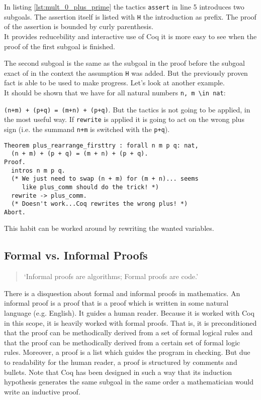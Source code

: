 In listing \ref{lst:mult_0_plus_prime} the tactics \lstinline!assert! in line 5 introduces two subgoals. 
The assertion itself is listed with \lstinline!H! the introduction as prefix.
The proof of the assertion is bounded by curly parenthesis.\\
It provides reducebility and interactive use of Coq it is more easy to see when the proof of the first subgoal is finished.

The second subgoal is the same as the subgoal in the proof before the subgoal exact of in the context the assumption \lstinline!H! was added.
But the previously proven fact is able to be used to make progress.
Let's look at another example.\\
 
It should be shown that we have for all natural numbers \lstinline!n, m \in nat!:
 
\lstinline!(n+m) + (p+q) = (m+n) + (p+q)!.
But the tactics is not going to be applied, in the most useful way. 
If \lstinline!rewrite! is applied it is going to act on the wrong plus sign (i.e. the summand \lstinline!n+m! is switched with the \lstinline!p+q!).
\begin{lstlisting}[caption = \lstinline!plus_rearrange_firstttry!, label=lst:plus_rearrange_firsttry]
Theorem plus_rearrange_firsttry : forall n m p q: nat,
  (n + m) + (p + q) = (m + n) + (p + q).
Proof.
  intros n m p q.
  (* We just need to swap (n + m) for (m + n)... seems
     like plus_comm should do the trick! *)
  rewrite -> plus_comm.
  (* Doesn't work...Coq rewrites the wrong plus! *)
Abort.
\end{lstlisting}

This habit can be worked around by rewriting the wanted variables. 

\subsection{Formal vs. Informal Proofs}

\begin{quote}
`Informal proofs are algorithms; Formal proofs are code.'
\end{quote}

There is a disquestion about formal and informal proofs in mathematics. 
An informal proof is a proof that is a proof which is written in some natural language (e.g. English).
It guides a human reader.   
Because it is worked with Coq in this scope, it is heavily worked with formal proofs.
That is, it is preconditioned that the proof can be methodically derived from a set of formal logical rules and that the proof can be methodically derived from a certain set of formal logic rules.
Moreover, a proof is a list which guides the program in checking. 
But due to readability for the human reader, a proof is structured by comments and bullets.
Note that Coq has been designed in such a way that its induction hypothesis generates the same subgoal in the same order a mathematician would write an inductive proof.                                                                                            









